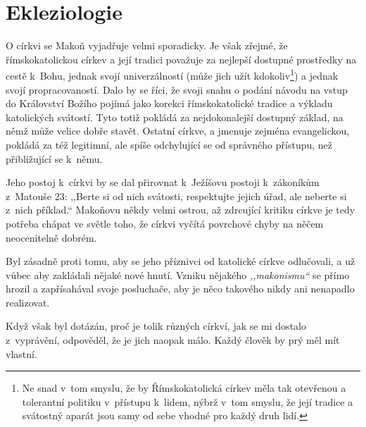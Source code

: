 \section{Ekleziologie}

O církvi se Makoň vyjadřuje velmi sporadicky. Je však zřejmé, že římskokatolickou
církev a její tradici považuje za nejlepší dostupné prostředky na cestě k~Bohu,
jednak svojí univerzálností (může jich užít kdokoliv\footnote{Ne snad v~tom
smyslu, že by Římskokatolická církev měla tak otevřenou a tolerantní politiku
v~přístupu k~lidem, nýbrž v~tom smyslu, že její tradice a svátostný aparát
jsou samy od sebe vhodné pro každý druh lidí.}) a jednak svojí
propracovaností. Dalo by se říci, že svoji snahu o podání návodu na vstup do
Království Božího pojímá jako korekci římskokatolické tradice a výkladu
katolických svátostí. Tyto totiž pokládá za nejdokonalejší dostupný základ, na
němž může velice dobře stavět. Ostatní církve, a jmenuje zejména evangelickou,
pokládá za též legitimní, ale spíše odchylující se od správného přístupu, než
přibližující se k~němu.

Jeho postoj k~církvi by se dal přirovnat k~Ježíšovu postoji k~zákoníkům
z~Matouše 23: ,,Berte
si od nich svátosti, respektujte jejich úřad, ale neberte si z~nich příklad.``
Makoňovu někdy velmi ostrou, až zdrcující kritiku církve je tedy potřeba chápat
ve světle toho, že církvi vyčítá povrchové chyby na něčem neocenitelně dobrém.

Byl zásadně proti tomu, aby se jeho příznivci od katolické církve odlučovali, a
už vůbec aby zakládali nějaké nové hnutí. Vzniku nějakého \textit{,,makonismu``}
se přímo hrozil a zapřísahával svoje posluchače, aby je něco takového nikdy ani
nenapadlo realizovat.

Když však byl dotázán, proč je tolik různých církví, jak se mi dostalo
z~vyprávění, odpověděl, že je jich naopak málo. Každý člověk by prý měl mít
vlastní.

